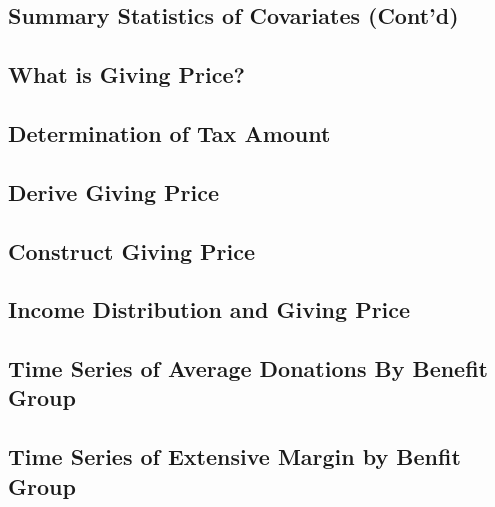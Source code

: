 \documentclass[ review  , 3p ]{elsarticle}
\begin{document}
  \hypertarget{summary-statistics-of-covariates-contd}{%
  \subsection{Summary Statistics of Covariates (Cont'd)}\label{summary-statistics-of-covariates-contd}}
  
  \hypertarget{what-is-giving-price}{%
  \subsection{What is Giving Price?}\label{what-is-giving-price}}
  
  \hypertarget{determination-of-tax-amount}{%
  \subsection{Determination of Tax Amount}\label{determination-of-tax-amount}}
  
  \hypertarget{derive-giving-price}{%
  \subsection{Derive Giving Price}\label{derive-giving-price}}
  
  \hypertarget{construct-giving-price}{%
  \subsection{Construct Giving Price}\label{construct-giving-price}}
  
  \hypertarget{income-distribution-and-giving-price}{%
  \subsection{Income Distribution and Giving Price}\label{income-distribution-and-giving-price}}
  
  \hypertarget{time-series-of-average-donations-by-benefit-group}{%
  \subsection{Time Series of Average Donations By Benefit Group}\label{time-series-of-average-donations-by-benefit-group}}
  
  \hypertarget{time-series-of-extensive-margin-by-benfit-group}{%
  \subsection{Time Series of Extensive Margin by Benfit Group}\label{time-series-of-extensive-margin-by-benfit-group}}
  
\end{document}
